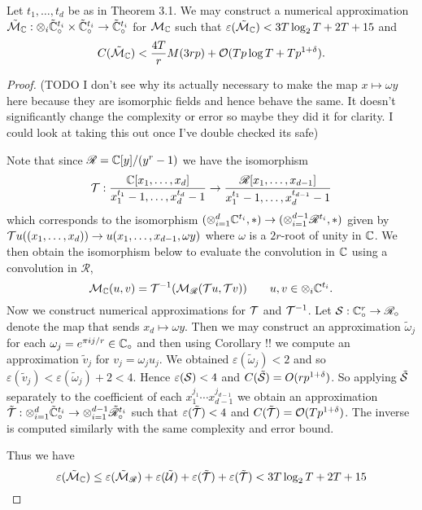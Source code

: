\begin{proposition}
    Let $t_1, \ldots, t_d$ be as in Theorem 3.1. We may construct a numerical approximation $\tilde{\mathcal M}_{\mathbb C}: \otimes_i \tilde{{\mathbb C}}^{t_i}_\circ \times \tilde{{\mathbb C}}^{t_i}_\circ \to \tilde{{\mathbb C}}^{t_i}_\circ$ for $\mathcal M_{\mathbb C}$ such that $\varepsilon(\tilde{\mathcal M}_{\mathbb C}) < 3 T \log_2 T + 2 T + 15$ and
    \[
        C(\tilde{\mathcal M}_{\mathbb C}) < \frac{4T}{r} M(3rp) + \mathcal O(Tp \log T + Tp^{1 + \delta}).
    \]
\end{proposition}

\begin{proof}

    (TODO I don't see why its actually necessary to make the map $x \mapsto \omega y$ here because they are isomorphic fields and hence behave the same. It doesn't significantly change the complexity or error so maybe they did it for clarity. I could look at taking this out once I've double checked its safe)

    \medskip

    Note that since $\mathscr{R} = {\mathbb C}[y]/(y^{r} - 1)$ we have the isomorphism
    \[
        \mathcal T: \frac{{\mathbb C}[x_1, \ldots, x_d]}{x_1^{t_1} - 1, \ldots, x_d^{t_d} - 1} \to \frac{\mathscr{R}[x_1, \ldots, x_{d-1}]}{x_1^{t_1} - 1, \ldots, x_d^{t_{d-1}} - 1}
    \]
    which corresponds to the isomorphism $(\otimes_{i=1}^d {\mathbb C}^{t_i}, \ast) \to (\otimes_{i=1}^{d-1} \mathscr{R}^{t_i}, \ast)$ given by $\mathcal Tu((x_1, \ldots, x_d)) \to u(x_1, \ldots, x_{d-1}, \omega y)$ where $\omega$ is a $2r$-root of unity in ${\mathbb C}$. We then obtain the isomorphism below to evaluate the convolution in ${\mathbb C}$ using a convolution in $\mathscr{R}$,
    \[
        \mathcal M_{\mathbb C}(u, v) = \mathcal T^{-1}(\mathcal M_{\mathscr{R}}(\mathcal Tu, \mathcal Tv)) \qquad u, v \in \otimes_i {\mathbb C}^{t_i}.
    \]
    Now we construct numerical approximations for $\mathcal T$ and $\mathcal T^{-1}$. Let $\mathcal S: {\mathbb C}^r_\circ \to \mathscr{R}_\circ$ denote the map that sends $x_d \mapsto \omega y$. Then we may construct an approximation $\tilde{\omega}_j$ for each $\omega_j = e^{\pi i j / r} \in {\mathbb C}_\circ$ and then using Corollary !! we compute an approximation $\tilde{v}_j$ for $v_j = \omega_j u_j$. We obtained $\varepsilon(\tilde{\omega}_j) < 2$ and so $\varepsilon(\tilde{v}_j) < \varepsilon(\tilde{\omega}_j) + 2 < 4$. Hence $\varepsilon(\mathcal S) < 4$ and $C(\tilde{\mathcal S}) = O(r p^{1 + \delta})$. So applying $\tilde{\mathcal S}$ separately to the coefficient of each $x_1^{j_1} \cdots x_{d-1}^{j_{d-1}}$ we obtain an approximation $\tilde{\mathcal T}: \otimes_{i=1}^d \tilde{{\mathbb C}}^{t_i}_\circ \to \otimes^{d-1}_{i=1} \tilde{\mathscr{R}}_\circ^{t_i}$ such that $\varepsilon(\tilde{\mathcal T}) < 4$ and $C(\tilde{\mathcal T}) = \mathcal O(Tp^{1 + \delta})$. The inverse is computed similarly with the same complexity and error bound.

    Thus we have
    \[
        \varepsilon(\tilde{\mathcal M}_{\mathbb C}) \le \varepsilon(\tilde{\mathcal M}_{\mathscr{R}}) + \varepsilon(\tilde{\mathcal U}) + \varepsilon(\tilde{\mathcal T}) + \varepsilon(\tilde{\mathcal T}) < 3T \log_2 T + 2T + 15
    \]
\end{proof}

